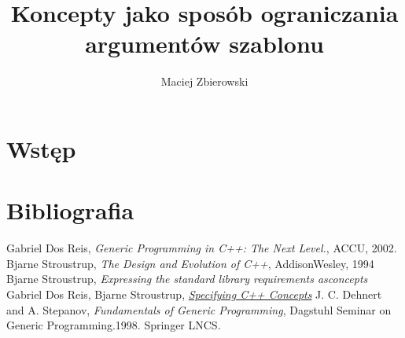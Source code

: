 \documentclass[11pt, a4paper]{article}
\author{Maciej Zbierowski}
\title{Koncepty jako sposób ograniczania argumentów szablonu}
\begin{document}
	\maketitle
	\newpage
	\tableofcontents
	\newpage
	
	\section*{Wstęp}

	

	
	
	
	\newpage
	
	
	
	\newpage
	
	
	
	

	
	
	
	
	\newpage
	
	\section{Bibliografia}
	\begin{thebibliography}{2}
	
	 Gabriel Dos Reis, \emph{Generic Programming in C++: The Next Level.}, ACCU, 2002.
	 Bjarne Stroustrup, \emph{The Design and Evolution of C++}, AddisonWesley, 1994
	  Bjarne Stroustrup, \emph{Expressing the standard library requirements asconcepts}	
	 Gabriel Dos Reis, Bjarne Stroustrup, \href{http://www.stroustrup.com/popl06.pdf}{\emph{Specifying C++ Concepts}}
	 J. C. Dehnert and A. Stepanov, \emph{Fundamentals of Generic Programming}, Dagstuhl Seminar on Generic Programming.1998. Springer LNCS.
	
	\end{thebibliography}
\end{document}
